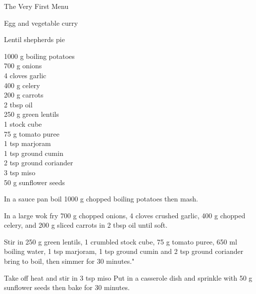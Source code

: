 \begin{menu}{The Very First Menu}
\begin{recipe}{2}{Egg and vegetable curry}
\begin{instructions}
    \end{instructions}
    \end{recipe}%
  
    \begin{recipe}{2}{Lentil shepherds pie}%
    
	
		\begin{ingredients}
		1000 g boiling potatoes  \\
	700 g onions  \\
	4 cloves garlic  \\
	400 g celery  \\
	200 g carrots  \\
	2 tbsp oil  \\
	250 g green lentils  \\
	1  stock cube  \\
	75 g tomato puree  \\
	1 tsp marjoram  \\
	1 tsp ground cumin  \\
	2 tsp ground coriander  \\
	3 tsp miso  \\
	50 g sunflower seeds  \\
	
		\end{ingredients}
	
    \begin{instructions}
    \item 
        In a sauce pan boil
        1000 g chopped boiling potatoes
        then mash.
      \item 
        In a large wok fry
        700 g chopped onions,
        4 cloves crushed garlic,
        400 g chopped celery,
        and
        200 g sliced carrots
        in
        2 tbsp  oil
        until soft.
      \item 
        Stir in
        250 g  green lentils,
        1  crumbled stock cube,
        75 g  tomato puree,
        650 ml  boiling water,
        1 tsp  marjoram,
        1 tsp  ground cumin
        and
        2 tsp  ground coriander
        bring to boil,
        then simmer for 30 minutes."
      \item 
        Take off heat and stir in
        3 tsp  miso
        Put in a casserole dish
        and sprinkle with 
        50 g  sunflower seeds
        then bake  for 30 minutes.
      
    \end{instructions}
    \end{recipe}%
  

\end{menu}
